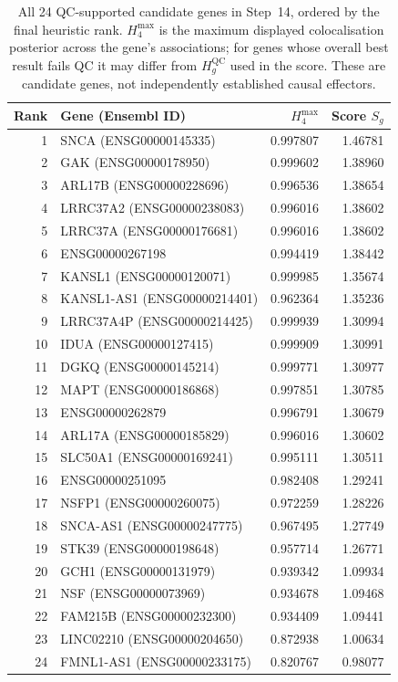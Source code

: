\documentclass[11pt,a4paper]{article}
\begin{document}
\begin{table}[!htbp]
\centering\scriptsize
\caption{All 24 QC-supported candidate genes in Step~14, ordered by the final heuristic rank. $H_4^{\max}$ is the maximum displayed colocalisation posterior across the gene's associations; for genes whose overall best result fails QC it may differ from $H_g^{\mathrm{QC}}$ used in the score. These are candidate genes, not independently established causal effectors.}
\label{tab:step14_genes}
\begin{tabular}{@{}rlrr@{}}
\toprule Rank & Gene (Ensembl ID) & $H_4^{\max}$ & Score $S_g$\\\midrule
1 & SNCA (ENSG00000145335) & 0.997807 & 1.46781\\
2 & GAK (ENSG00000178950) & 0.999602 & 1.38960\\
3 & ARL17B (ENSG00000228696) & 0.996536 & 1.38654\\
4 & LRRC37A2 (ENSG00000238083) & 0.996016 & 1.38602\\
5 & LRRC37A (ENSG00000176681) & 0.996016 & 1.38602\\
6 & ENSG00000267198 & 0.994419 & 1.38442\\
7 & KANSL1 (ENSG00000120071) & 0.999985 & 1.35674\\
8 & KANSL1-AS1 (ENSG00000214401) & 0.962364 & 1.35236\\
9 & LRRC37A4P (ENSG00000214425) & 0.999939 & 1.30994\\
10 & IDUA (ENSG00000127415) & 0.999909 & 1.30991\\
11 & DGKQ (ENSG00000145214) & 0.999771 & 1.30977\\
12 & MAPT (ENSG00000186868) & 0.997851 & 1.30785\\
13 & ENSG00000262879 & 0.996791 & 1.30679\\
14 & ARL17A (ENSG00000185829) & 0.996016 & 1.30602\\
15 & SLC50A1 (ENSG00000169241) & 0.995111 & 1.30511\\
16 & ENSG00000251095 & 0.982408 & 1.29241\\
17 & NSFP1 (ENSG00000260075) & 0.972259 & 1.28226\\
18 & SNCA-AS1 (ENSG00000247775) & 0.967495 & 1.27749\\
19 & STK39 (ENSG00000198648) & 0.957714 & 1.26771\\
20 & GCH1 (ENSG00000131979) & 0.939342 & 1.09934\\
21 & NSF (ENSG00000073969) & 0.934678 & 1.09468\\
22 & FAM215B (ENSG00000232300) & 0.934409 & 1.09441\\
23 & LINC02210 (ENSG00000204650) & 0.872938 & 1.00634\\
24 & FMNL1-AS1 (ENSG00000233175) & 0.820767 & 0.98077\\
\bottomrule\end{tabular}
\end{table}
\end{document}

